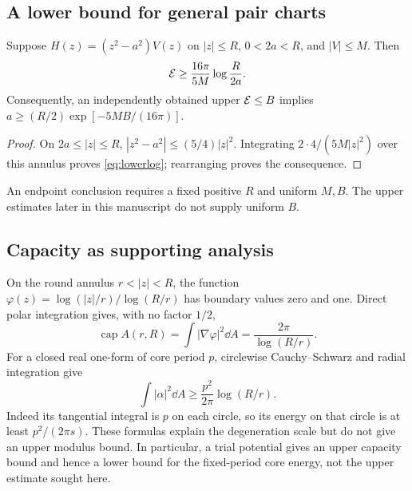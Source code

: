 \subsection{A lower bound for general pair charts}
\begin{lemma}\label{lem:screenlower}
Suppose $H(z)=(z^2-a^2)V(z)$ on $|z|\le R$, $0<2a<R$, and
$|V|\le M$. Then
\begin{equation}\label{eq:lowerlog}
 \mathcal E\ge\frac{16\pi}{5M}\log\frac{R}{2a}.
\end{equation}
Consequently, an independently obtained upper $\mathcal E\le B$ implies
$a\ge(R/2)\exp[-5MB/(16\pi)]$.
\end{lemma}
\begin{proof}
On $2a\le|z|\le R$, $|z^2-a^2|\le(5/4)|z|^2$.
Integrating $2\cdot4/(5M|z|^2)$ over this annulus proves
\eqref{eq:lowerlog}; rearranging proves the consequence.
\end{proof}
An endpoint conclusion requires a fixed positive $R$ and uniform $M,B$.
The upper estimates later in this manuscript do not supply uniform $B$.

\subsection{Capacity as supporting analysis}
On the round annulus $r<|z|<R$, the function
$\varphi(z)=\log(|z|/r)/\log(R/r)$ has boundary values zero and one.
Direct polar integration gives, with no factor $1/2$,
\[
 \operatorname{cap}A(r,R)=\int|\nabla\varphi|^2\dd A
        =\frac{2\pi}{\log(R/r)}.
\]
For a closed real one-form of core period $p$, circlewise
Cauchy--Schwarz and radial integration give
\[
 \int|\alpha|^2\dd A\ge\frac{p^2}{2\pi}\log(R/r).
\]
Indeed its tangential integral is $p$ on each circle, so its energy on
that circle is at least $p^2/(2\pi s)$. These formulas explain the
degeneration scale but do not give an upper modulus bound. In particular,
a trial potential gives an upper capacity bound and hence a lower bound
for the fixed-period core energy, not the upper estimate sought here.
